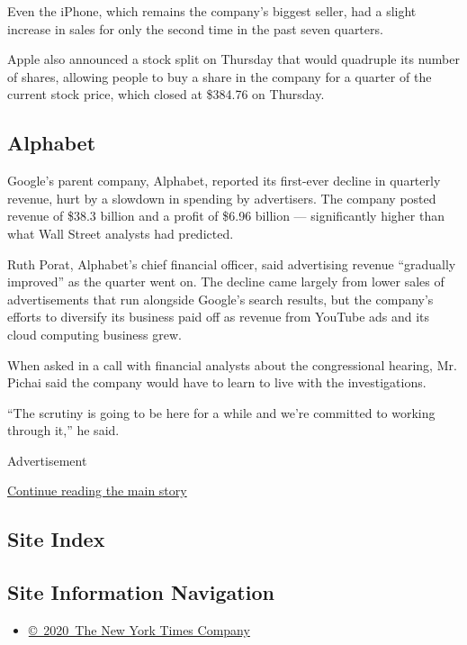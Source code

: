 Even the iPhone, which remains the company's biggest seller, had a
slight increase in sales for only the second time in the past seven
quarters.

Apple also announced a stock split on Thursday that would quadruple its
number of shares, allowing people to buy a share in the company for a
quarter of the current stock price, which closed at \$384.76 on
Thursday.

\hypertarget{alphabet}{%
\subsection{Alphabet}\label{alphabet}}

Google's parent company, Alphabet, reported its first-ever decline in
quarterly revenue, hurt by a slowdown in spending by advertisers. The
company posted revenue of \$38.3 billion and a profit of \$6.96 billion
--- significantly higher than what Wall Street analysts had predicted.

Ruth Porat, Alphabet's chief financial officer, said advertising revenue
``gradually improved'' as the quarter went on. The decline came largely
from lower sales of advertisements that run alongside Google's search
results, but the company's efforts to diversify its business paid off as
revenue from YouTube ads and its cloud computing business grew.

When asked in a call with financial analysts about the congressional
hearing, Mr. Pichai said the company would have to learn to live with
the investigations.

``The scrutiny is going to be here for a while and we're committed to
working through it,'' he said.

Advertisement

\protect\hyperlink{after-bottom}{Continue reading the main story}

\hypertarget{site-index}{%
\subsection{Site Index}\label{site-index}}

\hypertarget{site-information-navigation}{%
\subsection{Site Information
Navigation}\label{site-information-navigation}}

\begin{itemize}
\tightlist
\item
  \href{https://help.nytimes3xbfgragh.onion/hc/en-us/articles/115014792127-Copyright-notice}{©~2020~The
  New York Times Company}
\end{itemize}

